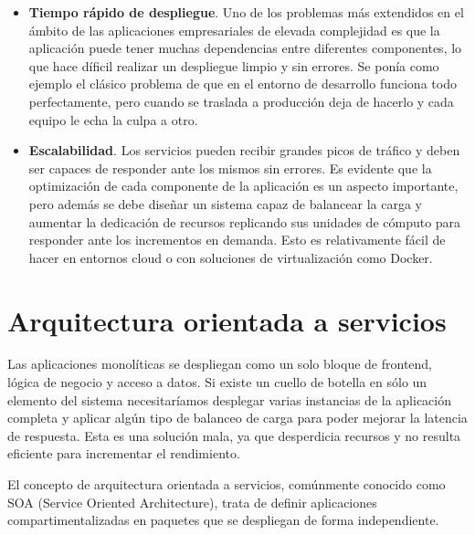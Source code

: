 \begin{itemize}
\begin{figure}
\caption{\label{fig:zerodt}Esquema de recuperación ante fallos.}
\end{figure}
Cómo se puede observar en la Fgura~\ref{fig:zerodt}, cuando el servidor físico A falla, se desencadena una migración del contenedor virtual al servidor B. Lo que debería ocurrir sin problema en caso de que el volumen de datos compartido por red siga disponible y solo haya ocurrido un problema aislado en la máquina A.
\item \textbf{Tiempo rápido de despliegue}. Uno de los problemas más extendidos en el ámbito de las aplicaciones empresariales de elevada complejidad es que la aplicación puede tener muchas dependencias entre diferentes componentes, lo que hace díficil realizar un despliegue limpio y sin errores. Se ponía como ejemplo el clásico problema de que en el entorno de desarrollo funciona todo perfectamente, pero cuando se traslada a producción deja de hacerlo y cada equipo le echa la culpa a otro.
\item \textbf{Escalabilidad}. Los servicios pueden recibir grandes picos de tráfico y deben ser capaces de responder ante los mismos sin errores. Es evidente que la optimización de cada componente de la aplicación es un aspecto importante, pero además se debe diseñar un sistema capaz de balancear la carga y aumentar la dedicación de recursos replicando sus unidades de cómputo para responder ante los incrementos en demanda. Esto es relativamente fácil de hacer en entornos cloud o con soluciones de virtualización como Docker.
\end{itemize}

\section{Arquitectura orientada a servicios}

Las aplicaciones monolíticas se despliegan como un solo bloque de frontend, lógica de negocio y acceso a datos. Si existe un cuello de botella en sólo un elemento del sistema necesitaríamos desplegar varias instancias de la aplicación completa  y aplicar algún tipo de balanceo de carga para poder mejorar la latencia de respuesta. Esta es una solución mala, ya que desperdicia recursos y no resulta eficiente para incrementar el rendimiento.

El concepto de arquitectura orientada a servicios, comúnmente conocido como SOA (Service Oriented Architecture), trata de definir aplicaciones compartimentalizadas en paquetes que se despliegan de forma independiente.

